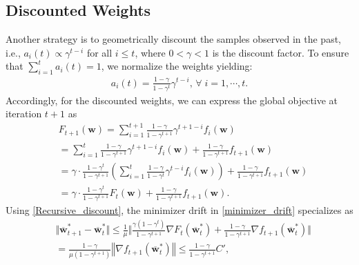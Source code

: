 \documentclass[conference]{IEEEtran}
\begin{document}
\subsection{Discounted Weights}
Another strategy is to geometrically discount the samples observed in the past, i.e., $a_i(t) \propto \gamma^{t-i}$ for all $i\leq t$, where $0<\gamma<1$ is the discount factor. To ensure that $\sum_{i=1}^t a_i(t) =1$, we normalize the weights yielding:
\begin{align}
    a_i(t) = \frac{1-\gamma}{1-\gamma^t} \gamma^{t-i},\, \forall\; i =1,\cdots,t.
\end{align}
Accordingly, for the discounted weights, we can express the global objective at iteration $t+1$ as 
\begin{align}
    &F_{t+1}(\mathbf{w})= \sum_{i=1}^{t+1} \frac{1-\gamma}{1-\gamma^{t+1}} \gamma^{t+1-i} f_i(\mathbf{w})  \nonumber\\
    &= \sum_{i=1}^t \frac{1-\gamma}{1-\gamma^{t+1}} \gamma^{t+1-i} f_i(\mathbf{w})  + \frac{1-\gamma}{1-\gamma^{t+1}} f_{t+1}(\mathbf{w})  \nonumber\\
    &= \gamma \cdot \frac{1-\gamma^t}{1-\gamma^{t+1}} \left( \sum_{i=1}^{t} \frac{1-\gamma}{1-\gamma^t} \gamma^{t-i} f_i(\mathbf{w}) \right) + \frac{1-\gamma}{1-\gamma^{t+1}} f_{t+1}(\mathbf{w}) \nonumber\\
    &= \gamma \cdot \frac{1-\gamma^t}{1-\gamma^{t+1}} F_t(\mathbf{w}) + \frac{1-\gamma}{1-\gamma^{t+1}} f_{t+1}(\mathbf{w}).
    \label{Recursive_discount}
\end{align}
Using \eqref{Recursive_discount}, the minimizer drift in \eqref{minimizer_drift} specializes as
\begin{align}
     &\Vert  \overline{\mathbf{w}}^*_{t+1}{-} \overline{\mathbf{w}}^*_{t} \Vert{\leq} \frac{1}{\mu} \Big\Vert \frac{\gamma(1{-}\gamma^t)}{1{-}\gamma^{t+1}}  \nabla F_t(\overline{\mathbf{w}}^*_{t}) {+}  \frac{1{-}\gamma}{1{-}\gamma^{t+1}} \nabla f_{t+1}(\overline{\mathbf{w}}^*_{t})\Big\Vert \nonumber \\
    &= \frac{1-\gamma}{\mu(1-\gamma^{t+1})} \left\Vert \nabla f_{t+1}(\overline{\mathbf{w}}^*_{t})\right\Vert \leq  \frac{1-\gamma}{1-\gamma^{t+1}} 
     C'%
     ,\label{minimizer_drift_discount}
\end{align}
\end{document}
